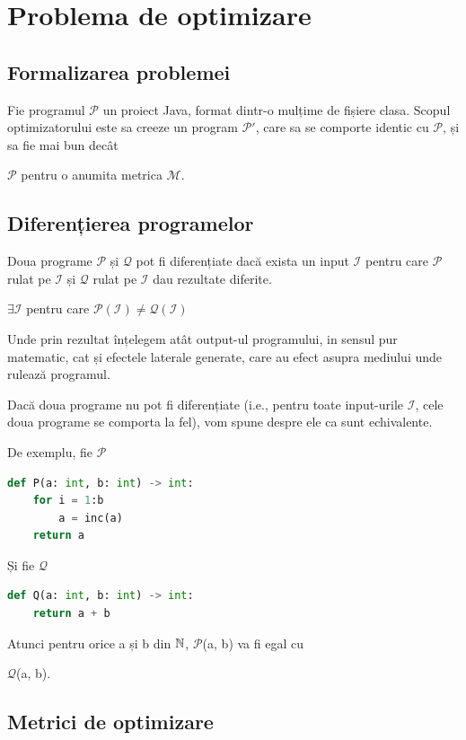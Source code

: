 \newcommand{\s}[1]{
	\(\mathcal{#1}\)}

\chapter{Problema de optimizare}

\section{Formalizarea problemei}

Fie programul \s{P} un proiect Java, format dintr-o mulțime de fișiere
clasa.  Scopul optimizatorului este sa creeze un program \s{P'}, care
sa se comporte identic cu \s{P}, și sa fie mai bun decât
\s{P} pentru o anumita metrica \s{M}.

\section{Diferențierea programelor}

Doua programe \s{P} și \s{Q} pot fi diferențiate dacă
exista un input \s{I} pentru care \s{P} rulat pe \s{I}
și \s{Q} rulat pe \s{I} dau rezultate diferite.

\(\exists \mathcal{I}\) pentru care \(\mathcal{P}(\mathcal{I}) \ne
\mathcal{Q}(\mathcal{I}) \)

Unde prin rezultat înțelegem atât output-ul programului, in
sensul pur matematic, cat și efectele laterale generate, care au
efect asupra mediului unde rulează programul.

Dacă doua programe nu pot fi diferențiate (i.e., pentru toate
input-urile \s{I}, cele doua programe se comporta la fel), vom
spune despre ele ca sunt echivalente.

De exemplu, fie \s{P}

\begin{lstlisting}[language=Python,label={programul_p}]
def P(a: int, b: int) -> int:
    for i = 1:b
        a = inc(a)
    return a
\end{lstlisting}

Și fie \s{Q}

\begin{lstlisting}[language=Python,label={programul_q}]
def Q(a: int, b: int) -> int:
    return a + b
\end{lstlisting}

Atunci pentru orice a și b din $\mathbb{N}$, \s{P}(a, b) va fi egal cu
\s{Q}(a, b).

\section{Metrici de optimizare}

